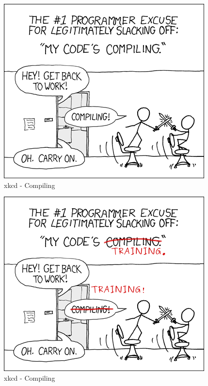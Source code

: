 \documentclass[aspectratio=169]{beamer}
\begin{document}
\begin{frame}
	\begin{center}
		\begin{figure}
			\includegraphics[scale=0.5]{imgs/xkcd_compiling.png}
			\caption{xkcd - Compiling}
		\end{figure}
	\end{center}
\end{frame}

\begin{frame}
	\begin{center}
		\begin{figure}
			\includegraphics[scale=0.5]{imgs/xkcd_training.png}
			\caption{xkcd - Compiling}
		\end{figure}
	\end{center}
\end{frame}
\end{document}
